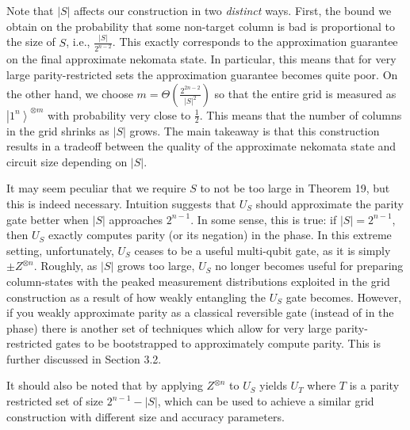 Note that $|S|$ affects our construction in two \emph{distinct} ways. First, the bound we obtain on the probability that some non-target column is bad is proportional to the size of $S$, i.e., $\frac{|S|}{2^{n-2}}$. This exactly corresponds to the approximation guarantee on the final approximate nekomata state. In particular, this means that for very large parity-restricted sets the approximation guarantee becomes quite poor. On the other hand, we choose $m=\Theta(\frac{2^{2n-2}}{|S|^{2}})$ so that the entire grid is measured as $\left|1^{n}\right\rangle^{\otimes m}$ with probability very close to $\frac{1}{2}$. This means that the number of columns in the grid shrinks as $|S|$ grows. The main takeaway is that this construction results in a tradeoff between the quality of the approximate nekomata state and circuit size depending on $|S|$.\par




It may seem peculiar that we require $S$ to not be too large in Theorem 19, but this is indeed necessary. Intuition suggests that $U_{S}$ should approximate the parity gate better when $|S|$ approaches $2^{n-1}$. In some sense, this is true: if $|S|=2^{n-1}$, then $U_{S}$ exactly computes parity (or its negation) in the phase. In this extreme setting, unfortunately, $U_{S}$ ceases to be a useful multi-qubit gate, as it is simply $\pm Z^{\otimes n}$. Roughly, as $|S|$ grows too large, $U_{S}$ no longer becomes useful for preparing column-states with the peaked measurement distributions exploited in the grid construction as a result of how weakly entangling the $U_{S}$ gate becomes. However, if you weakly approximate parity as a classical reversible gate (instead of in the phase) there is another set of techniques which allow for very large parity-restricted gates to be bootstrapped to approximately compute parity. This is further discussed in Section 3.2.\par




It should also be noted that by applying $Z^{\otimes n}$ to $U_{S}$ yields $U_{T}$ where $T$ is a parity restricted set of size $2^{n-1}-|S|$, which can be used to achieve a similar grid construction with different size and accuracy parameters.\par




